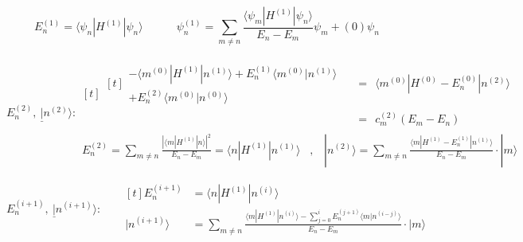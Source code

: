 \documentclass[12pt]{article}
\begin{document}
\vspace{10pt}
\[ \boxed{ E_n^{(1)} = \langle \psi_n | H^{(1)} | \psi_n \rangle } \hspace{18pt} \hspace{18pt} 
    \boxed{ \psi_n^{(1)} = \sum_{m \neq n} \frac{\langle \psi_m | H^{(1)} | \psi_n \rangle}{E_n - E_m} \psi_m
    + (0) \psi_n } \]

\vspace{20pt} \noindent
\(
    \underline{ E_n^{(2)} , \ | n^{(2)} \rangle:} 
    \begin{gathered}[t]
        \begin{aligned}[t]
                \begin{gathered}
                        - \langle m^{(0)} | H^{(1)} | n^{(1)} \rangle 
                            + E_n^{(1)} \langle m^{(0)} | n^{(1)} \rangle 
                            \\[5pt]
                        + E_n^{(2)} \langle m^{(0)} | n^{(0)} \rangle 
                    \end{gathered}
                    \ \ & = \ \ \langle m^{(0)} | H^{(0)} - E_n^{(0)} | n^{(2)} \rangle
                    \\[-10pt]
                & = \ \ c_m^{(2)} (E_m - E_n)
            \end{aligned}
            \\[10pt]
        \boxed{ E_n^{(2)} = \sum_{m \neq n} \frac{ \left| \langle m | H^{(1)} | n \rangle \right|^2 }{E_n - E_m} }
            = \langle n | H^{(1)} | n^{(1)} \rangle     
            \hspace{10pt} , \hspace{10pt} 
            \boxed{ 
                | n^{(2)} \rangle = \sum_{m \neq n} \frac{ 
                    \langle m | H^{(1)} - E_n^{(1)} | n^{(1)} \rangle 
                }{E_n - E_m} \cdot | m \rangle 
            }
    \end{gathered}
\)

\vspace{30pt}\noindent
\(
    \underline{ E_n^{(i+1)},\ | n^{(i+1)} \rangle: } \hspace{20pt}
    \begin{aligned}[t]
        E_n^{(i+1)} & = \langle n | H^{(1)} | n^{(i)} \rangle\\[5pt]
        | n^{(i+1)} \rangle & = \sum_{m \neq n} \frac{ 
                \langle m | H^{(1)} | n^{(i)} \rangle 
                - \sum_{j=0}^{i} E_n^{(j+1)} \langle m | n^{(i-j)} \rangle 
            }{E_n-E_m}
            \cdot | m \rangle 
    \end{aligned}
\)
\end{document}
